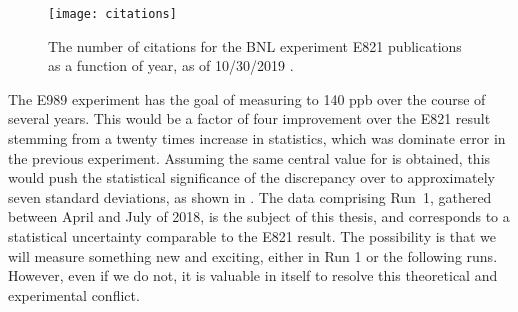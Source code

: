 \begin{figure}
	\centering
	\texttt{[image: citations]}
	\caption[Citations for E821 publications vs year]{The number of citations for the BNL experiment E821 publications as a function of year, as of 10/30/2019 \cite{MarkComm}.}
	\label{fig:E821Citations}
\end{figure}


The E989 experiment has the goal of measuring \amu to 140 ppb over the course of several years. This would be a factor of four improvement over the E821 result stemming from a twenty times increase in statistics, which was dominate error in the previous experiment. Assuming the same central value for \amu is obtained, this would push the statistical significance of the discrepancy over to approximately seven standard deviations, as shown in . The data comprising Run~1, gathered between April and July of 2018, is the subject of this thesis, and corresponds to a statistical uncertainty comparable to the E821 result. The possibility is that we will measure something new and exciting, either in Run 1 or the following runs. However, even if we do not, it is valuable in itself to resolve this theoretical and experimental conflict.


